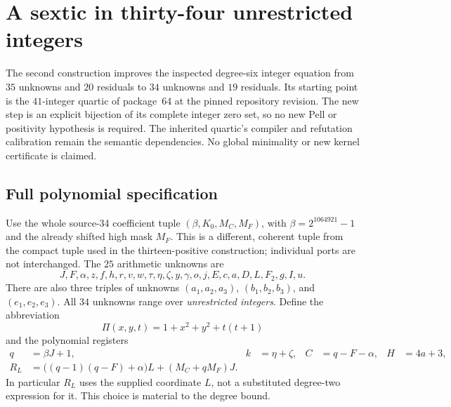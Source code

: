 \section{A sextic in thirty-four unrestricted integers}
\label{sec:sextic34}

The second construction improves the inspected degree-six integer equation
from $35$ unknowns and $20$ residuals to $34$ unknowns and $19$ residuals.
Its starting point is the $41$-integer quartic of package~64 at the pinned
repository revision.  The new step is an explicit bijection of its complete
integer zero set, so no new Pell or positivity hypothesis is required.
The inherited quartic's compiler and refutation calibration remain the
semantic dependencies.  No global minimality or new kernel certificate is
claimed.

\subsection{Full polynomial specification}

Use the whole source-34 coefficient tuple $(\beta,K_0,M_C,M_F)$, with
$\beta=2^{1064921}-1$ and the already shifted high mask $M_F$.
This is a different, coherent tuple from the compact tuple used in the
thirteen-positive construction; individual ports are not interchanged.
The $25$ arithmetic unknowns are
\[
 J,F,\alpha,z,f,h,r,v,w,\tau,\eta,\zeta,y,\gamma,o,j,
 E,c,a,D,L,F_2,g,I,u.
\]
There are also three triples of unknowns
$(a_1,a_2,a_3)$, $(b_1,b_2,b_3)$, and $(e_1,e_2,e_3)$.
All $34$ unknowns range over \emph{unrestricted integers}.
Define the abbreviation
\[
 \Pi(x,y,t)=1+x^2+y^2+t(t+1)
\]
and the polynomial registers
\begin{align*}
 q&=\beta J+1,& k&=\eta+\zeta,& C&=q-F-\alpha,& H&=4a+3,\\
 R_L&=\bigl((q-1)(q-F)+\alpha\bigr)L+(M_C+qM_F)J.
\end{align*}
In particular $R_L$ uses the supplied coordinate $L$, not a substituted
degree-two expression for it.  This choice is material to the degree bound.


